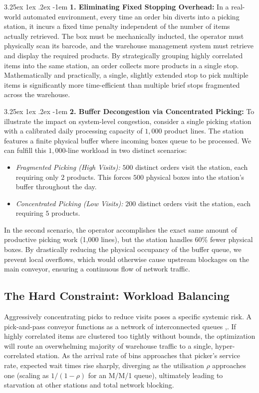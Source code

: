 \documentclass[preprint,review,11pt,authoryear]{elsarticle}
\makeatletter
\renewcommand\paragraph{\@startsection{paragraph}{4}{\z@}
  {3.25ex \@plus1ex \@minus.2ex}
  {-1em}
  {\normalfont\normalsize\itshape}}
\makeatother
\begin{document}
\paragraph{\textbf{1. Eliminating Fixed Stopping Overhead: }}
In a real-world automated environment, every time an order bin diverts into a picking station, it incurs a fixed time penalty independent of the number of items actually retrieved. The box must be mechanically inducted, the operator must physically scan its barcode, and the warehouse management system must retrieve and display the required products. By strategically grouping highly correlated items into the same station, an order collects more products in a single stop. Mathematically and practically, a single, slightly extended stop to pick multiple items is significantly more time-efficient than multiple brief stops fragmented across the warehouse.

\paragraph{\textbf{2. Buffer Decongestion via Concentrated Picking: }}
To illustrate the impact on system-level congestion, consider a single picking station with a calibrated daily processing capacity of $1,000$ product lines. The station features a finite physical buffer where incoming boxes queue to be processed. We can fulfill this $1,000$-line workload in two distinct scenarios:
\begin{itemize}
    \item \textit{Fragmented Picking (High Visits):} $500$ distinct orders visit the station, each requiring only $2$ products. This forces $500$ physical boxes into the station's buffer throughout the day.
    \item \textit{Concentrated Picking (Low Visits):} $200$ distinct orders visit the station, each requiring $5$ products. 
\end{itemize}
In the second scenario, the operator accomplishes the exact same amount of productive picking work (1,000 lines), but the station handles 60\% fewer physical boxes. By drastically reducing the physical occupancy of the buffer queue, we prevent local overflows, which would otherwise cause upstream blockages on the main conveyor, ensuring a continuous flow of network traffic.

\subsection{The Hard Constraint: Workload Balancing}\label{par:balanced_workload} 
Aggressively concentrating picks to reduce visits poses a specific systemic risk. A pick-and-pass conveyor functions as a network of interconnected queues \cite{kim2020},\cite{tarczynski2023}. If highly correlated items are clustered too tightly without bounds, the optimization will route an overwhelming majority of warehouse traffic to a single, hyper-correlated station. As the arrival rate of bins approaches that picker's service rate, expected wait times rise sharply, diverging as the utilisation $\rho$ approaches one (scaling as $1/(1-\rho)$ for an M/M/1 queue), ultimately leading to starvation at other stations and total network blocking.
\end{document}
